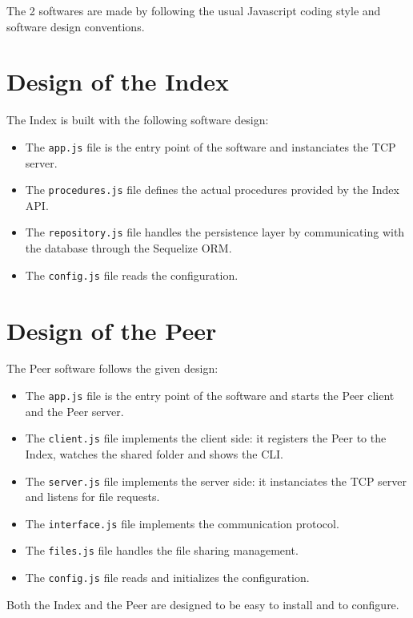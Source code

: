 \documentclass{article}
\begin{document}
\noindent The 2 softwares are made by following the usual Javascript coding style and software design conventions.

\section{Design of the Index}

The Index is built with the following software design:

\begin{itemize}
	\item The \Verb+app.js+ file is the entry point of the software and instanciates the TCP server.
	\item The \Verb+procedures.js+ file defines the actual procedures provided by the Index API.
	\item The \Verb+repository.js+ file handles the persistence layer by communicating with the database through the Sequelize ORM.
	\item The \Verb+config.js+ file reads the configuration.
\end{itemize}

\section{Design of the Peer}

The Peer software follows the given design:

\begin{itemize}
	\item The \Verb+app.js+ file is the entry point of the software and starts the Peer client and the Peer server.
	\item The \Verb+client.js+ file implements the client side: it registers the Peer to the Index, watches the shared folder and shows the CLI.
	\item The \Verb+server.js+ file implements the server side: it instanciates the TCP server and listens for file requests.
	\item The \Verb+interface.js+ file implements the communication protocol.
	\item The \Verb+files.js+ file handles the file sharing management.
	\item The \Verb+config.js+ file reads and initializes the configuration.
\end{itemize}

\noindent Both the Index and the Peer are designed to be easy to install and to configure.
\end{document}
